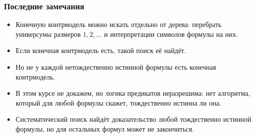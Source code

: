\documentclass[10pt]{beamer}
\begin{document}
\begin{frame}
\frametitle{Последние замечания}
\begin{itemize}
    \item Конечную контрмодель можно искать отдельно от дерева: перебрать универсумы размеров $1,2,\ldots$ и интерпретации символов формулы на них.
    \item Если конечная контрмодель есть, такой поиск её найдёт.
    \item Но не у каждой нетождественно истинной формулы есть конечная контрмодель.
    \pause
    \item В этом курсе не докажем, но логика предикатов неразрешима: нет алгоритма, который для любой формулы скажет, тождественно истинна ли она.
    \item Систематический поиск найдёт доказательство любой тождественно истинной формулы, но для остальных формул может не закончиться.
\end{itemize}
\end{frame}
\end{document}

